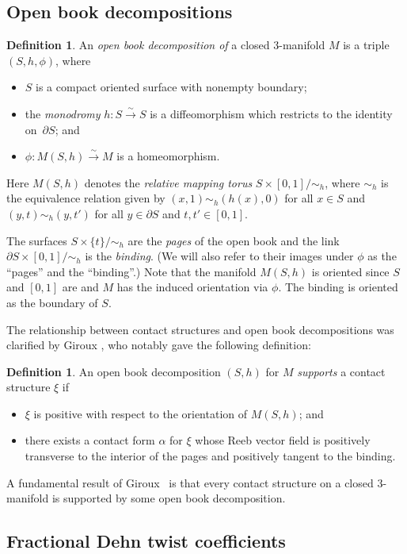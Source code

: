 \documentclass[10pt]{amsart}
\newcommand{\isom}{\stackrel\sim\longrightarrow}
\theoremstyle{plain}
\theoremstyle{definition}
\newtheorem{defn}[thm]{Definition}
\numberwithin{equation}{subsection}
\let\Subsection\subsection\let\Subsubsection\subsubsection
\begin{document}
\Subsection{Open book decompositions}

\begin{defn}
An {\em open book decomposition of} a closed $3$-manifold $M$ is a triple $(S,h,\phi)$, where
\begin{itemize}
\item $S$ is a compact oriented surface with nonempty boundary;
\item the {\em monodromy} $h:S\isom S$ is a diffeomorphism which restricts to the identity on~$\partial S$; and
\item $\phi : M(S,h) \isom M$ is a homeomorphism.
\end{itemize}
Here $M(S,h)$ denotes the {\em relative mapping torus} $S\times [0,1]/\sim_h$, where $\sim_h$ is the equivalence relation given by $(x,1)\sim_h (h(x),0)$ for all $x\in S$ and $(y,t)\sim_h (y,t')$ for all $y\in \partial S$ and $t,t' \in [0,1]$.
\end{defn}

The surfaces $S\times \{ t\}/\sim_h$ are the {\em pages} of the open book and the link $\partial S\times [0,1]/\sim_h$ is the {\em binding}. (We will also refer to their images under $\phi$ as the ``pages'' and the ``binding''.) Note that the manifold $M(S,h)$ is oriented since $S$ and $[0,1]$ are and $M$ has the induced orientation via $\phi$. The binding is oriented as the boundary of $S$.

The relationship between contact structures and open book decompositions was clarified by Giroux \cite{Gi}, who notably gave the following definition:

\begin{defn}
An open book decomposition $(S,h)$ for $M$ {\em supports} a contact structure $\xi$ if
\begin{itemize}
\item $\xi$ is positive with respect to the orientation of $M(S,h)$; and
\item there exists a contact form $\alpha$ for $\xi$ whose Reeb vector field is positively transverse to the interior of the pages and positively tangent to the binding.
\end{itemize}
\end{defn}

A fundamental result of Giroux~\cite{Gi} is that every contact structure on a closed $3$-manifold is supported by some open book decomposition.

\subsection{Fractional Dehn twist coefficients}
\end{document}
